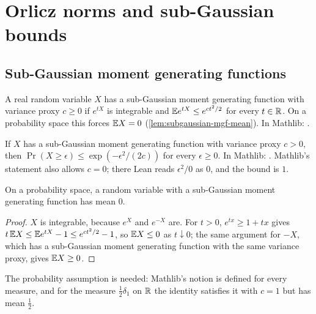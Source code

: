 \chapter{Orlicz norms and sub-Gaussian bounds}
\label{chap:orlicz}

\section{Sub-Gaussian moment generating functions}

\begin{definition}
  \label{def:subgaussian-mgf}
  \mathlibok
  A real random variable $X$ has a sub-Gaussian moment generating function with variance proxy $c\ge0$ if $e^{tX}$ is integrable and $\mathbb{E} e^{tX}\le e^{ct^2/2}$ for every $t\in\mathbb{R}$. On a probability space this forces $\mathbb{E} X=0$ (\cref{lem:subgaussian-mgf-mean}).
  In Mathlib: .
\end{definition}

\begin{lemma}
  \label{lem:subgaussian-mgf-tail}
  \mathlibok
  If $X$ has a sub-Gaussian moment generating function with variance proxy $c>0$, then $\Pr(X\ge\epsilon)\le\exp(-\epsilon^2/(2c))$ for every $\epsilon\ge0$.
  In Mathlib: . Mathlib's statement also allows $c=0$; there Lean reads $\epsilon^2/0$ as $0$, and the bound is $1$.
\end{lemma}

\begin{lemma}
  \label{lem:subgaussian-mgf-mean}
  On a probability space, a random variable with a sub-Gaussian moment generating function has mean $0$.
\end{lemma}
\begin{proof}
  $X$ is integrable, because $e^{X}$ and $e^{-X}$ are. For $t>0$, $e^{tx}\ge1+tx$ gives $t\,\mathbb{E} X\le\mathbb{E} e^{tX}-1\le e^{ct^2/2}-1$, so $\mathbb{E} X\le0$ as $t\downarrow0$; the same argument for $-X$, which has a sub-Gaussian moment generating function with the same variance proxy, gives $\mathbb{E} X\ge0$.
\end{proof}
\begin{remark}
  The probability assumption is needed: Mathlib's notion is defined for every measure, and for the measure $\frac12\delta_1$ on $\mathbb{R}$ the identity satisfies it with $c=1$ but has mean $\frac12$.
\end{remark}

